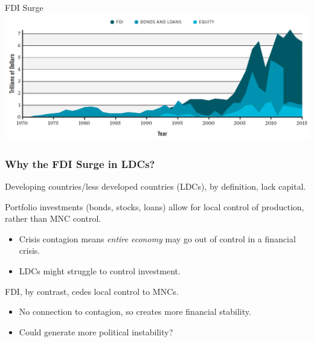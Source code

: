 \documentclass{beamer}
\begin{document}
\begin{frame}{\LARGE FDI Surge}
	\centering
	\includegraphics[width=\textwidth,height=0.8\textheight,keepaspectratio]{invest.png}
\end{frame}

\begin{frame} 
	\frametitle{\LARGE{Why the FDI Surge in LDCs?}}
	\begin{itemize}
		\large{
			\item Developing countries/less developed countries (LDCs), by definition, lack capital. \pause 
			\item Portfolio investments (bonds, stocks, loans) allow for local control of production, rather than MNC control. \pause 
			\begin{itemize}
				\item Crisis contagion means \textit{entire economy} may go out of control in a financial crisis. \pause  
				\item LDCs might struggle to control investment. \pause 
			\end{itemize}
			\item FDI, by contrast, cedes local control to MNCs. \pause 
			\begin{itemize}
				\item No connection to contagion, so creates more financial stability. \pause 
				\item Could generate more political instability?
			\end{itemize}
		}
	\end{itemize}
\end{frame}



		
\end{document}
